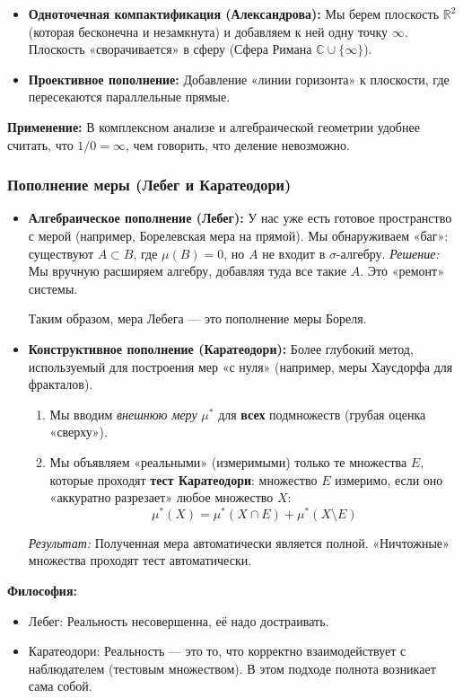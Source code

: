 \documentclass[11pt, a4paper]{extarticle}
\newcommand{\R}{{\mathbb R}}
\newcommand{\C}{{\mathbb C}}
\begin{document}
    \begin{itemize}
        \item \textbf{Одноточечная компактификация (Александрова):}
        Мы берем плоскость $\R^2$ (которая бесконечна и незамкнута) и добавляем к ней одну точку $\infty$. Плоскость «сворачивается» в сферу (Сфера Римана $\C \cup \{\infty\}$).
        \item \textbf{Проективное пополнение:}
        Добавление «линии горизонта» к плоскости, где пересекаются параллельные прямые.
    \end{itemize}
    \textbf{Применение:} В комплексном анализе и алгебраической геометрии удобнее считать, что $1/0 = \infty$, чем говорить, что деление невозможно.
    
\subsubsection{Пополнение меры (Лебег и Каратеодори)}

\begin{itemize}
    \item \textbf{Алгебраическое пополнение (Лебег):}
    У нас уже есть готовое пространство с мерой (например, Борелевская мера на прямой). Мы обнаруживаем «баг»: существуют $A \subset B$, где $\mu(B)=0$, но $A$ не входит в $\sigma$-алгебру.
    \textit{Решение:} Мы вручную расширяем алгебру, добавляя туда все такие $A$. Это «ремонт» системы.

    Таким образом, мера Лебега — это пополнение меры Бореля.
    
    \item \textbf{Конструктивное пополнение (Каратеодори):}
    Более глубокий метод, используемый для построения мер «с нуля» (например, меры Хаусдорфа для фракталов).
    \begin{enumerate}
        \item Мы вводим \textit{внешнюю меру} $\mu^*$ для \textbf{всех} подмножеств (грубая оценка «сверху»).
        \item Мы объявляем «реальными» (измеримыми) только те множества $E$, которые проходят \textbf{тест Каратеодори}: множество $E$ измеримо, если оно «аккуратно разрезает» любое множество $X$:
        $$ \mu^*(X) = \mu^*(X \cap E) + \mu^*(X \setminus E) $$
    \end{enumerate}
    \textit{Результат:} Полученная мера автоматически является полной. «Ничтожные» множества проходят тест автоматически.
\end{itemize}
\textbf{Философия:} 
\begin{itemize}
    \item Лебег: Реальность несовершенна, её надо достраивать.
    \item Каратеодори: Реальность — это то, что корректно взаимодействует с наблюдателем (тестовым множеством). В этом подходе полнота возникает сама собой.
\end{itemize}
\end{document}

